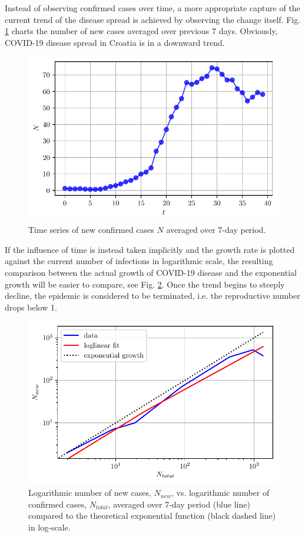 \documentclass[conference]{IEEEtran}
\begin{document}
Instead of observing confirmed cases over time, a more appropriate capture of the current trend of the disease spread is achieved by observing the change itself. Fig. \ref{fig.newcases} charts the number of new cases averaged over previous 7 days. Obviously, COVID-19 disease spread in Croatia is in a downward trend. 
\begin{figure}[]
    \centering
    \includegraphics[width=\linewidth]{figs/7-day-avg-conf-cases.pdf}
    \caption{Time series of new confirmed cases $N$ averaged over 7-day period.}
    \label{fig.newcases}
\end{figure}
If the influence of time is instead taken implicitly and the growth rate is plotted against the current number of infections in logarithmic scale, the resulting comparison between the actual growth of COVID-19 disease and the exponential growth will be easier to compare, see Fig. \ref{fig.new-v-total}. Once the trend begins to steeply decline, the epidemic is considered to be terminated, i.e. the reproductive number drops below 1. 
\begin{figure}[]
    \centering
    \includegraphics[width=\linewidth]{figs/new-v-total.pdf}
    \caption{Logarithmic number of new cases, $N_{new}$, vs. logarithmic number of confirmed cases, $N_{total}$, averaged over 7-day period (blue line) compared to the theoretical exponential function (black dashed line) in log-scale.}
    \label{fig.new-v-total}
\end{figure}
\end{document}
